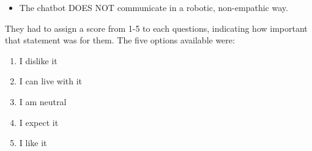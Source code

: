 \begin{appendices}
\begin{itemize}
		\item The chatbot DOES NOT communicate in a robotic, non-empathic way.
	\end{itemize}
	They had to assign a score from 1-5 to each questions, indicating how important that statement was for them. The five options available were:
	\begin{enumerate}
		\item I dislike it
		\item I can live with it
		\item I am neutral
		\item I expect it
		\item I like it
	\end{enumerate}
\end{appendices}
